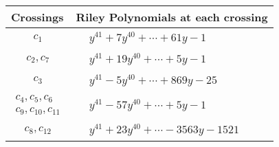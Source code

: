 \documentclass[1p]{elsarticle_modified}
\theoremstyle{definition}
\begin{document}
\begin{tabular}{m{50pt}|m{274pt}}
Crossings & \hspace{64pt}Riley Polynomials at each crossing \\
\hline $$\begin{aligned}c_{1}\end{aligned}$$&$\begin{aligned}
&y^{41}+7 y^{40}+\cdots+61 y-1
\end{aligned}$\\
\hline $$\begin{aligned}c_{2},c_{7}\end{aligned}$$&$\begin{aligned}
&y^{41}+19 y^{40}+\cdots+5 y-1
\end{aligned}$\\
\hline $$\begin{aligned}c_{3}\end{aligned}$$&$\begin{aligned}
&y^{41}-5 y^{40}+\cdots+869 y-25
\end{aligned}$\\
\hline $$\begin{aligned}c_{4},c_{5},c_{6}\\c_{9},c_{10},c_{11}\end{aligned}$$&$\begin{aligned}
&y^{41}-57 y^{40}+\cdots+5 y-1
\end{aligned}$\\
\hline $$\begin{aligned}c_{8},c_{12}\end{aligned}$$&$\begin{aligned}
&y^{41}+23 y^{40}+\cdots-3563 y-1521
\end{aligned}$\\
\hline
\end{tabular}
\vskip 2pc
\end{document}
